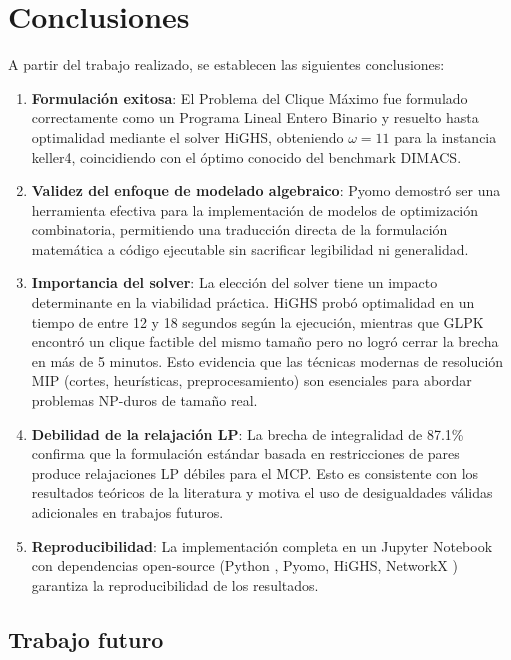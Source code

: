 \section{Conclusiones}

A partir del trabajo realizado, se establecen las siguientes conclusiones:

\begin{enumerate}
    \item \textbf{Formulación exitosa}: El Problema del Clique Máximo fue formulado correctamente como un Programa Lineal Entero Binario y resuelto hasta optimalidad mediante el solver HiGHS, obteniendo $\omega = 11$ para la instancia keller4, coincidiendo con el óptimo conocido del benchmark DIMACS.

    \item \textbf{Validez del enfoque de modelado algebraico}: Pyomo demostró ser una herramienta efectiva para la implementación de modelos de optimización combinatoria, permitiendo una traducción directa de la formulación matemática a código ejecutable sin sacrificar legibilidad ni generalidad.

    \item \textbf{Importancia del solver}: La elección del solver tiene un impacto determinante en la viabilidad práctica. HiGHS probó optimalidad en un tiempo de entre 12 y 18 segundos según la ejecución, mientras que GLPK encontró un clique factible del mismo tamaño pero no logró cerrar la brecha en más de 5 minutos. Esto evidencia que las técnicas modernas de resolución MIP (cortes, heurísticas, preprocesamiento) son esenciales para abordar problemas NP-duros de tamaño real.

    \item \textbf{Debilidad de la relajación LP}: La brecha de integralidad de 87.1\% confirma que la formulación estándar basada en restricciones de pares produce relajaciones LP débiles para el MCP. Esto es consistente con los resultados teóricos de la literatura \parencite{bomze1999} y motiva el uso de desigualdades válidas adicionales en trabajos futuros.

    \item \textbf{Reproducibilidad}: La implementación completa en un Jupyter Notebook \parencite{jupyter2016} con dependencias open-source (Python \parencite{python3}, Pyomo, HiGHS, NetworkX \parencite{networkx2008}) garantiza la reproducibilidad de los resultados.
\end{enumerate}

\subsection{Trabajo futuro}

